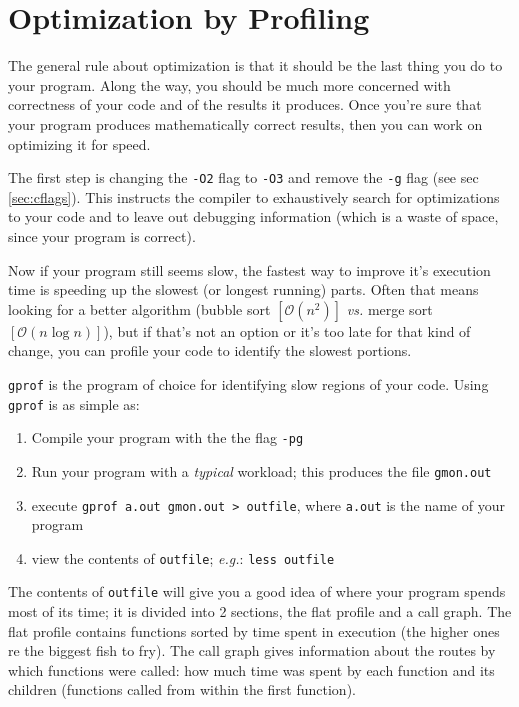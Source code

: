 \documentclass[letterpaper,12pt]{article}
\begin{document}
\section{Optimization by Profiling}
The general rule about optimization is that it should be the last thing you do to your program. Along the way, you should be much more concerned with correctness of your code and of the results it produces. Once you're sure that your program produces mathematically correct results, then you can work on optimizing it for speed.

The first step is changing the \texttt{-O2} flag to \texttt{-O3} and remove the \texttt{-g} flag (see sec \ref{sec:cflags}). This instructs the compiler to exhaustively search for optimizations to your code and to leave out debugging information (which is a waste of space, since your program is correct).

Now if your program still seems slow, the fastest way to improve it's execution time is speeding up the slowest (or longest running) parts. Often that means looking for a better algorithm (bubble sort $[\mathscr{O}(n^2)]$ \emph{vs.} merge sort $[\mathscr{O}(n \log n)]$), but if that's not an option or it's too late for that kind of change, you can profile your code to identify the slowest portions.

\texttt{gprof} is the program of choice for identifying slow regions of your code. Using \texttt{gprof} is as simple as:
\begin{enumerate}
\item Compile your program with the the flag \texttt{-pg}
\item Run your program with a \emph{typical} workload; this produces the file \texttt{gmon.out}
\item execute \texttt{gprof a.out gmon.out > outfile}, where \texttt{a.out} is the name of your program
\item view the contents of \texttt{outfile}; \emph{e.g.}: \texttt{less outfile}
\end{enumerate}

The contents of \texttt{outfile} will give you a good idea of where your program spends most of its time; it is divided into 2 sections, the flat profile and a call graph. The flat profile contains functions sorted by time spent in execution (the higher ones re the biggest fish to fry). The call graph gives information about the routes by which functions were called: how much time was spent by each function and its children (functions called from within the first function).
\end{document}
